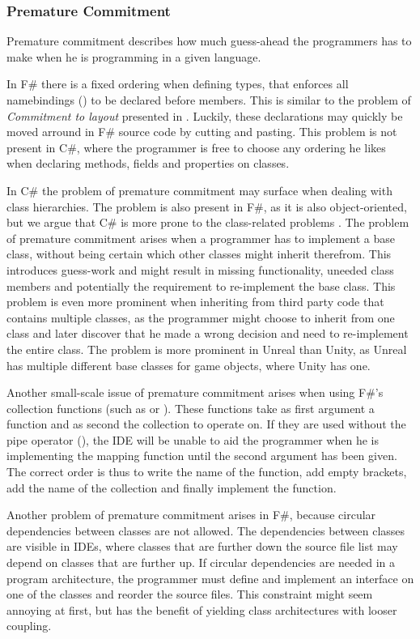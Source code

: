 \subsubsection{Premature Commitment}
Premature commitment describes how much guess-ahead the programmers has to make when he is programming in a given language. 

In F\# there is a fixed ordering when defining types, that enforces all namebindings () to be declared before members. This is similar to the problem of \textit{Commitment to layout} presented in \cite{green1996usability}. Luckily, these declarations may quickly be moved arround in F\# source code by cutting and pasting. This problem is not present in C\#, where the programmer is free to choose any ordering he likes when declaring methods, fields and properties on classes.

In C\# the problem of premature commitment may surface when dealing with class hierarchies. The problem is also present in F\#, as it is also object-oriented, but we argue that C\# is more prone to the class-related problems . The problem of premature commitment arises when a programmer has to implement a base class, without being certain which other classes might inherit therefrom. This introduces guess-work and might result in missing functionality, uneeded class members and potentially the requirement to re-implement the base class. This problem is even more prominent when inheriting from third party code that contains multiple classes, as the programmer might choose to inherit from one class and later discover that he made a wrong decision and need to re-implement the entire class. The problem is more prominent in Unreal than Unity, as Unreal has multiple different base classes for game objects\needcite, where Unity has one.

Another small-scale issue of premature commitment arises when using F\#'s collection functions (such as  or ). These functions take as first argument a function and as second the collection to operate on. If they are used without the pipe operator (\ttt{|\textgreater}), the \gls{IDE} will be unable to aid the programmer when he is implementing the mapping function until the second argument has been given. The correct order is thus to write the name of the function, add empty brackets, add the name of the collection and finally implement the function.

Another problem of premature commitment arises in F\#, because circular dependencies between classes are not allowed. The dependencies between classes are visible in \glspl{IDE}, where classes that are further down the source file list may depend on classes that are further up. If circular dependencies are needed in a program architecture, the programmer must define and implement an interface on one of the classes and reorder the source files. This constraint might seem annoying at first, but has the benefit of yielding class architectures with looser coupling\cite{interfaces:and:coupling}. 